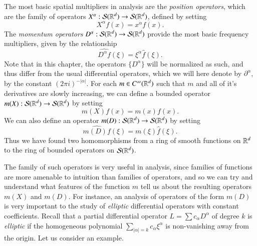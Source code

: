 The most basic spatial multipliers in analysis are the \emph{position operators}, which are the family of operators $X^\alpha: \mathcal{S}(\operatorname{\mathbb{R}}^d) \to \mathcal{S}(\operatorname{\mathbb{R}}^d)$, defined by setting
%
\[ X^\alpha f(x) = x^\alpha f(x). \]
%
The \emph{momentum operators} $D^\alpha: \mathcal{S}(\operatorname{\mathbb{R}}^d) \to \mathcal{S}(\operatorname{\mathbb{R}}^d)$ provide the most basic frequency multipliers, given by the relationship
%
\[ \widehat{D^\alpha f}(\xi) = \xi^\alpha \widehat{f}(\xi). \]
%
Note that in this chapter, the operators $\{ D^\alpha \}$ will be normalized as such, and thus differ from the usual differential operators, which we will here denote by $\partial^\alpha$, by the constant $(2 \pi i)^{-|\alpha|}$. For each $m \in C^\infty(\operatorname{\mathbb{R}}^d)$ such that $m$ and all of it's derivatives are slowly increasing, we can define a bounded operator $m(X): \mathcal{S}(\operatorname{\mathbb{R}}^d) \to \mathcal{S}(\operatorname{\mathbb{R}}^d)$ by setting
%
\[ m(X) f(x) = m(x) f(x). \]
%
We can also define an operator $m(D): \mathcal{S}(\operatorname{\mathbb{R}}^d) \to \mathcal{S}(\operatorname{\mathbb{R}}^d)$ by setting
%
\[ \widehat{m(D) f}(\xi) = m(\xi) \widehat{f}(\xi). \]
%
Thus we have found two homomorphisms from a ring of smooth functions on $\operatorname{\mathbb{R}}^d$ to the ring of bounded operators on $\mathcal{S}(\operatorname{\mathbb{R}}^d)$.

The family of such operators is very useful in analysis, since families of functions are more amenable to intuition than families of operators, and so we can try and understand what features of the function $m$ tell us about the resulting operators $m(X)$ and $m(D)$. For instance, an analysis of operators of the form $m(D)$ is very important to the study of \emph{elliptic} differential operators with constant coefficients. Recall that a partial differential operator $L = \sum c_\alpha D^\alpha$ of degree $k$ is \emph{elliptic} if the homogeneous polynomial $\sum_{|\alpha| = k} c_\alpha \xi^\alpha$ is non-vanishing away from the origin. Let us consider an example.

